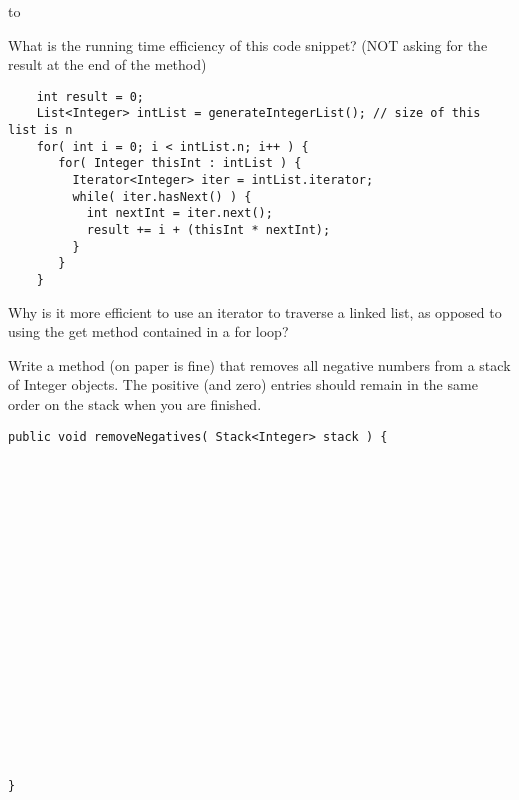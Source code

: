 \documentclass[11pt]{exam}
\begin{document}
\begin{center} 
\end{center} 

\lstset{language=Java,numbers=left}

\vspace{0.1in} 
\hbox to \textwidth{Name:\enspace\hrulefill} 

\begin{questions}

\question[7] What is the running time efficiency of this code snippet? (NOT asking for the result at the end of the method)
\begin{lstlisting}
    int result = 0;
    List<Integer> intList = generateIntegerList(); // size of this list is n
	for( int i = 0; i < intList.n; i++ ) {
	   for( Integer thisInt : intList ) {
	     Iterator<Integer> iter = intList.iterator;
	     while( iter.hasNext() ) {
	       int nextInt = iter.next();
	       result += i + (thisInt * nextInt);
	     }	
	   }
	}
\end{lstlisting}

\vspace{1in}

\question[5] Why is it more efficient to use an iterator to traverse a linked list, as opposed to using the get method contained in a for loop?
\vspace{2in}

\newpage
\question[8] Write a method (on paper is fine) that removes all negative numbers from a stack of Integer objects.  The positive (and zero) entries should remain in the same order on the stack when you are finished.

\begin{lstlisting}
public void removeNegatives( Stack<Integer> stack ) {




















}
\end{lstlisting}


\end{questions}
\end{document}

